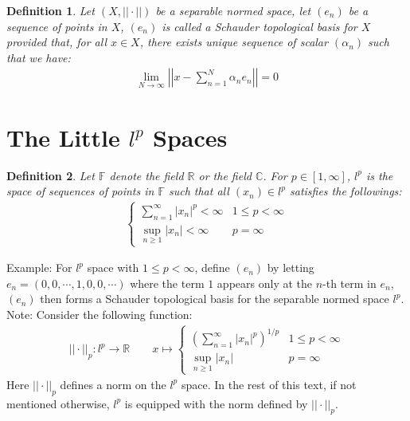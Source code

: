 \documentclass[11pt]{book}
\theoremstyle{break}
\theoremstyle{break}
\newtheorem{defn}{Definition}[corL]
\newcommand{\R}{\mathbb{R}}
\newcommand{\C}{\mathbb{C}}
\newcommand{\note}{\color{red}Note: \color{black}}
\newcommand{\example}{\color{green}Example: \color{black}}
\begin{document}
\begin{defn}
Let $(X,||\cdot ||)$ be a separable normed space, let $(e_n)$ be a sequence of points in $X$, $(e_n)$ is called a Schauder topological basis for $X$ provided that, for all $x \in X$, there exists unique sequence of scalar $(\alpha_n)$ such that we have:
\begin{align*}
\lim_{N \to \infty} \left|\left|x - \sum_{n=1}^N \alpha_n e_n \right|\right| = 0
\end{align*} 
\end{defn}


\newpage
\section[The Little $l^p$ Spaces]{\color{red}The Little $l^p$ Spaces \color{black}}
\begin{defn}
Let $\mathbb{F}$ denote the field $\R$ or the field $\C$. For $p \in [1,\infty]$, $l^p$ is the space of sequences of points in $\mathbb{F}$ such that all $(x_n) \in l^p$ satisfies the followings:
\begin{align*}
\begin{cases}
\sum_{n=1}^\infty |x_n|^p < \infty & 1\leq p < \infty \\
\sup_{n\geq 1}|x_n|< \infty & p=\infty
\end{cases}
\end{align*}
\end{defn}

\example For $l^p$ space with $1\leq p < \infty$, define $(e_n)$ by letting $e_n = (0,0,\cdots, 1,0,0,\cdots)$ where the term $1$ appears only at the $n$-th term in $e_n$, $(e_n)$ then forms a Schauder topological basis for the separable normed space $l^p$. \\

\note Consider the following function:
\begin{align*}
||\cdot ||_p :l^p \to \R \qquad x\mapsto \begin{cases}
\left( \sum_{n=1}^\infty |x_n|^p\right)^{1/p} & 1\leq p < \infty\\
\sup_{n\geq 1}|x_n| & p=\infty
\end{cases}
\end{align*}
Here $||\cdot ||_p$ defines a norm on the $l^p$ space. In the rest of this text, if not mentioned otherwise, $l^p$ is equipped with the norm defined by $||\cdot ||_p$. 
\end{document}
